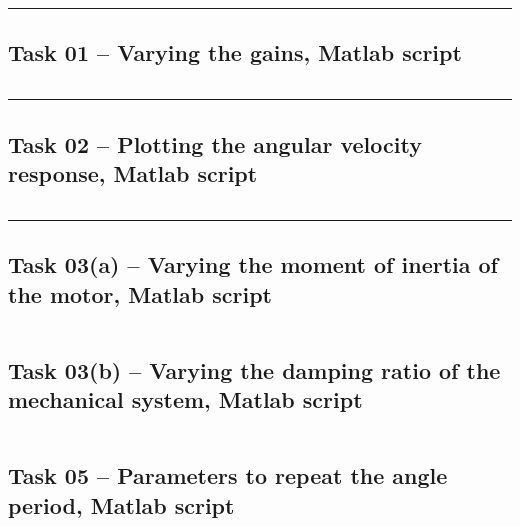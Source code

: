 \documentclass[12pt]{article}
\def\hr{{\par\noindent\rule{\textwidth}{0.4pt}}}
\begin{document}
\hr{}

\subsection{Task 01 -- Varying the gains, Matlab script}\label{sap:vary gains}
\inputminted{matlab}{src/lab08_task01_vary_gain.m}

\hr{}

\subsection{Task 02 -- Plotting the angular velocity response, Matlab script}\label{sap:plotting angular velocity}
\inputminted{matlab}{src/lab08_task02_plot_angular_velocity.m}

\hr{}

\subsection{Task 03(a) -- Varying the moment of inertia of the motor, Matlab script}\label{sap:vary moment of inertia}
\inputminted{matlab}{src/lab08_task03a_vary_motor_moment_of_inertia.m}

\subsection{Task 03(b) -- Varying the damping ratio of the mechanical system, Matlab script}\label{sap:vary damping ratio}
\inputminted{matlab}{src/lab08_task03b_vary_mechanical_sys_damping.m}

\subsection{Task 05 -- Parameters to repeat the angle period, Matlab script}\label{sap:repeat angle params}
\inputminted{matlab}{src/lab08_task05_angle_repeat_params.m}
\end{document}
